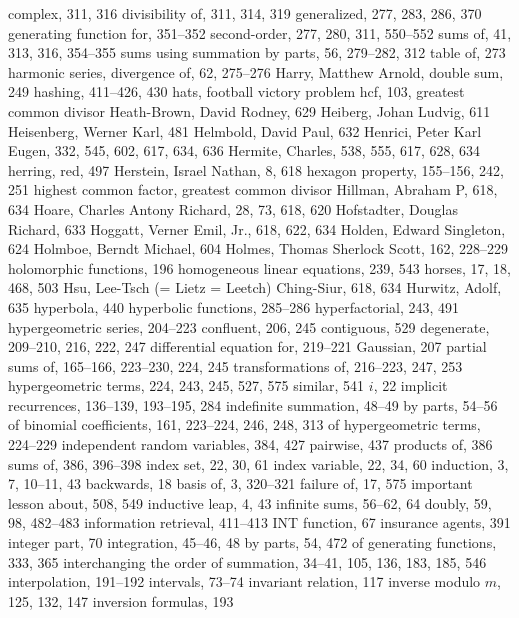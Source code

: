 \sub complex, 311, 316
\sub divisibility of, 311, 314, 319
\sub generalized, 277, 283, 286, 370
\sub generating function for, 351--352
\sub second-order, 277, 280, 311, 550--552
\sub sums of, 41, 313, 316, 354--355
\sub sums using summation by parts, 56, 279--282, 312
\sub table of, 273
harmonic series, divergence of, 62, 275--276
Harry, Matthew Arnold, double sum, 249
hashing, 411--426, 430
hats, \see football victory problem
hcf, 103, \see greatest common divisor
Heath-Brown, David Rodney, 629
Heiberg, Johan Ludvig, 611
Heisenberg, Werner Karl, 481
Helmbold, David Paul, 632
Henrici, Peter Karl Eugen, 332, 545, 602, 617, 634, 636
Hermite, Charles, 538, 555, 617, 628, 634
herring, red, 497
Herstein, Israel Nathan, 8, 618
hexagon property, 155--156, 242, 251
highest common factor, \see greatest common divisor
Hillman, Abraham P, 618, 634
Hoare, Charles Antony Richard, 28, 73, 618, 620
Hofstadter, Douglas Richard, 633
Hoggatt, Verner Emil, Jr., 618, 622, 634
Holden, Edward Singleton, 624
Holmboe, Berndt Michael, 604
Holmes, Thomas Sherlock Scott, 162, 228--229
holomorphic functions, 196
homogeneous linear equations, 239, 543
horses, 17, 18, 468, 503
Hsu, Lee-Tsch (= Lietz = Leetch) Ching-Siur, 618, 634
Hurwitz, Adolf, 635
hyperbola, 440
hyperbolic functions, 285--286
hyperfactorial, 243, 491
hypergeometric series, 204--223
\sub confluent, 206, 245
\sub contiguous, 529
\sub degenerate, 209--210, 216, 222, 247
\sub differential equation for, 219--221
\sub Gaussian, 207
\sub partial sums of, 165--166, 223--230, 224, 245
\sub transformations of, 216--223, 247, 253
hypergeometric terms, 224, 243, 245, 527, 575
\sub similar, 541
\medskip
$i$, 22
implicit recurrences, 136--139, 193--195, 284
indefinite summation, 48--49
\sub by parts, 54--56
\sub of binomial coefficients, 161, 223--224, 246, 248, 313
\sub of hypergeometric terms, 224--229
independent random variables, 384, 427
\sub pairwise, 437
\sub products of, 386
\sub sums of, 386, 396--398
index set, 22, 30, 61
index variable, 22, 34, 60
induction, 3, 7, 10--11, 43
\sub backwards, 18
\sub basis of, 3, 320--321
\sub failure of, 17, 575
\sub important lesson about, 508, 549
inductive leap, 4, 43
infinite sums, 56--62, 64
\sub doubly, 59, 98, 482--483
information retrieval, 411--413
INT function, 67
insurance agents, 391
integer part, 70
integration, 45--46, 48
\sub by parts, 54, 472
\sub of generating functions, 333, 365
interchanging the order of summation, 34--41, 105, 136, 183, 185, 546
interpolation, 191--192
intervals, 73--74
invariant relation, 117
inverse modulo $m$, 125, 132, 147
inversion formulas, 193
